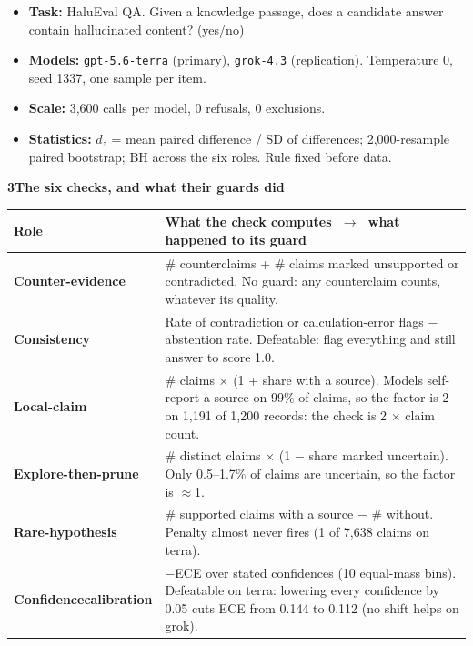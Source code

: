 \documentclass{article}
\newcommand{\smalltext}{\fontsize{24}{32}\selectfont}
\newcommand{\sect}[2]{%
  {\fontsize{40}{48}\selectfont\bfseries\color{accentdk}#1\hspace{0.45em}\color{ink}#2\par}
  \vspace{0.25em}{\color{accent}\rule{\linewidth}{4pt}}\par\vspace{0.35em}}
\begin{document}
\begin{minipage}[t]{14.0in}
{\smalltext
\begin{itemize}
\item \textbf{Task:} HaluEval QA. Given a knowledge passage, does a candidate answer contain hallucinated content? (yes/no)
\item \textbf{Models:} \texttt{gpt-5.6-terra} (primary), \texttt{grok-4.3} (replication). Temperature 0, seed 1337, one sample per item.
\item \textbf{Scale:} 3,600 calls per model, 0 refusals, 0 exclusions.
\item \textbf{Statistics:} $d_z$ = mean paired difference / SD of differences; 2,000-resample paired bootstrap; BH across the six roles. Rule fixed before data.
\end{itemize}}

\vspace{0.5em}
\sect{3}{The six checks, and what their guards did}
{\fontsize{25.5}{34}\selectfont
\renewcommand{\arraystretch}{1.3}
\begin{tabularx}{\linewidth}{@{}>{\bfseries}p{2.9in}X@{}}
\toprule
Role & What the check computes $\;\rightarrow\;$ what happened to its guard \\
\midrule
Counter-\newline evidence & \# counterclaims + \# claims marked unsupported or contradicted.
  \newline\textcolor{secondary}{No guard: any counterclaim counts, whatever its quality.} \\
Consistency & Rate of contradiction or calculation-error flags $-$ abstention rate.
  \newline\textcolor{secondary}{Defeatable: flag everything and still answer to score 1.0.} \\
Local-claim & \# claims $\times$ (1 + share with a source).
  \newline\textcolor{secondary}{Models self-report a source on 99\% of claims, so the factor is 2 on 1,191 of 1,200 records: the check is 2 $\times$ claim count.} \\
Explore-then-\newline prune & \# distinct claims $\times$ (1 $-$ share marked uncertain).
  \newline\textcolor{secondary}{Only 0.5--1.7\% of claims are uncertain, so the factor is $\approx$1.} \\
Rare-\newline hypothesis & \# supported claims with a source $-$ \# without.
  \newline\textcolor{secondary}{Penalty almost never fires (1 of 7,638 claims on terra).} \\
Confidence\newline calibration & $-$ECE over stated confidences (10 equal-mass bins).
  \newline\textcolor{secondary}{Defeatable on terra: lowering every confidence by 0.05 cuts ECE from 0.144 to 0.112 (no shift helps on grok).} \\
\bottomrule
\end{tabularx}}
\end{minipage}%
\end{document}
